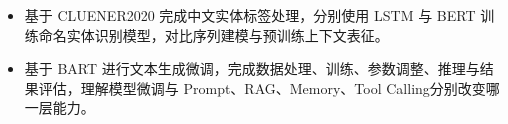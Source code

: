 \begin{itemize}[parsep=0.5ex]
  \item 基于 CLUENER2020 完成中文实体标签处理，分别使用 LSTM 与 BERT 训练命名实体识别模型，对比序列建模与预训练上下文表征。
  \item 基于 BART 进行文本生成微调，完成数据处理、训练、参数调整、推理与结果评估，理解模型微调与 Prompt、RAG、Memory、Tool Calling分别改变哪一层能力。
\end{itemize}

